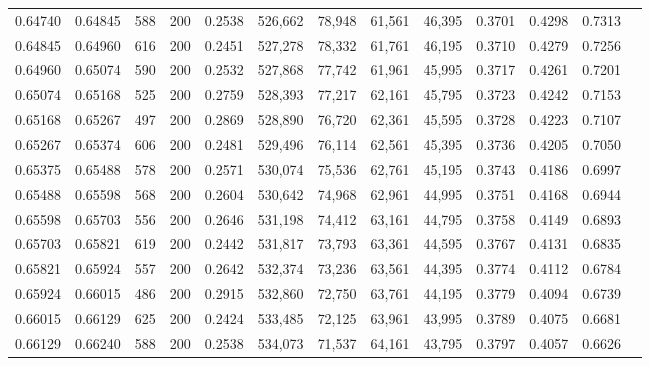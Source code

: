 \begin{tabular}{rrrrrrrrrrrrr}
0.64740 & 0.64845 &    588 & 200 &                                     0.2538 & 526,662 &  78,948 &  61,561 &  46,395 & 0.3701 & 0.4298 & 0.7313 \\
0.64845 & 0.64960 &    616 & 200 &                                     0.2451 & 527,278 &  78,332 &  61,761 &  46,195 & 0.3710 & 0.4279 & 0.7256 \\
0.64960 & 0.65074 &    590 & 200 &                                     0.2532 & 527,868 &  77,742 &  61,961 &  45,995 & 0.3717 & 0.4261 & 0.7201 \\
0.65074 & 0.65168 &    525 & 200 &                                     0.2759 & 528,393 &  77,217 &  62,161 &  45,795 & 0.3723 & 0.4242 & 0.7153 \\
0.65168 & 0.65267 &    497 & 200 &                                     0.2869 & 528,890 &  76,720 &  62,361 &  45,595 & 0.3728 & 0.4223 & 0.7107 \\
0.65267 & 0.65374 &    606 & 200 &                                     0.2481 & 529,496 &  76,114 &  62,561 &  45,395 & 0.3736 & 0.4205 & 0.7050 \\
0.65375 & 0.65488 &    578 & 200 &                                     0.2571 & 530,074 &  75,536 &  62,761 &  45,195 & 0.3743 & 0.4186 & 0.6997 \\
0.65488 & 0.65598 &    568 & 200 &                                     0.2604 & 530,642 &  74,968 &  62,961 &  44,995 & 0.3751 & 0.4168 & 0.6944 \\
0.65598 & 0.65703 &    556 & 200 &                                     0.2646 & 531,198 &  74,412 &  63,161 &  44,795 & 0.3758 & 0.4149 & 0.6893 \\
0.65703 & 0.65821 &    619 & 200 &                                     0.2442 & 531,817 &  73,793 &  63,361 &  44,595 & 0.3767 & 0.4131 & 0.6835 \\
0.65821 & 0.65924 &    557 & 200 &                                     0.2642 & 532,374 &  73,236 &  63,561 &  44,395 & 0.3774 & 0.4112 & 0.6784 \\
0.65924 & 0.66015 &    486 & 200 &                                     0.2915 & 532,860 &  72,750 &  63,761 &  44,195 & 0.3779 & 0.4094 & 0.6739 \\
0.66015 & 0.66129 &    625 & 200 &                                     0.2424 & 533,485 &  72,125 &  63,961 &  43,995 & 0.3789 & 0.4075 & 0.6681 \\
0.66129 & 0.66240 &    588 & 200 &                                     0.2538 & 534,073 &  71,537 &  64,161 &  43,795 & 0.3797 & 0.4057 & 0.6626 \\

\end{tabular}
